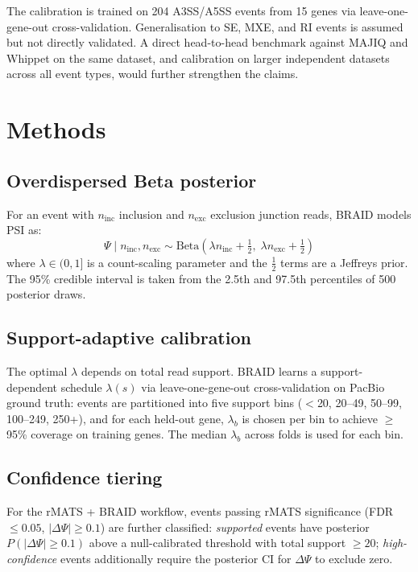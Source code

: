\documentclass[10pt]{article}
\begin{document}
The calibration is trained on 204 A3SS/A5SS events from 15 genes via leave-one-gene-out cross-validation.
Generalisation to SE, MXE, and RI events is assumed but not directly validated.
A direct head-to-head benchmark against MAJIQ and Whippet on the same dataset, and calibration on larger independent datasets across all event types, would further strengthen the claims.

\section*{Methods}

\subsection*{Overdispersed Beta posterior}

For an event with $n_{\text{inc}}$ inclusion and $n_{\text{exc}}$ exclusion junction reads, BRAID models PSI as:
\begin{equation}
    \Psi \mid n_{\text{inc}}, n_{\text{exc}} \sim \text{Beta}\!\left(\lambda n_{\text{inc}} + \tfrac{1}{2},\; \lambda n_{\text{exc}} + \tfrac{1}{2}\right)
\end{equation}
where $\lambda \in (0, 1]$ is a count-scaling parameter and the $\tfrac{1}{2}$ terms are a Jeffreys prior.
The 95\% credible interval is taken from the 2.5th and 97.5th percentiles of 500 posterior draws.

\subsection*{Support-adaptive calibration}

The optimal $\lambda$ depends on total read support.
BRAID learns a support-dependent schedule $\lambda(s)$ via leave-one-gene-out cross-validation on PacBio ground truth:
events are partitioned into five support bins ($<$20, 20--49, 50--99, 100--249, 250+), and for each held-out gene, $\lambda_b$ is chosen per bin to achieve $\geq$95\% coverage on training genes.
The median $\lambda_b$ across folds is used for each bin.

\subsection*{Confidence tiering}

For the rMATS + BRAID workflow, events passing rMATS significance (FDR $\leq 0.05$, $|\Delta\Psi| \geq 0.1$) are further classified:
\textit{supported} events have posterior $P(|\Delta\Psi| \geq 0.1)$ above a null-calibrated threshold with total support $\geq 20$;
\textit{high-confidence} events additionally require the posterior CI for $\Delta\Psi$ to exclude zero.
\end{document}
